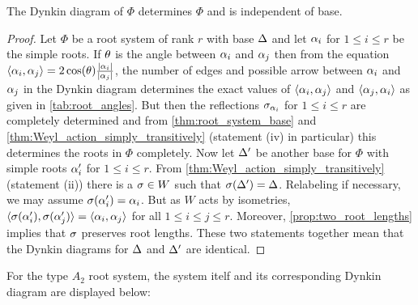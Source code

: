 \documentclass[12pt,reqno,oneside]{amsart}
\begin{document}
    \begin{proposition}\label{prop:Dynkin_diagram_unique}
        The Dynkin diagram of $\Phi$ determines $\Phi$ and is independent of base. 
    \end{proposition}
    \begin{proof}
        Let $\Phi$ be a root system of rank $r$ with base $\Delta$ and let $\alpha_{i}$ for $1 \le i \le r$ be the simple roots. If $\theta$ is the angle between $\alpha_{i}$ and $\alpha_{j}$ then from the equation $\langle\alpha_{i},\alpha_{j}\rangle = 2\cos(\theta)\frac{|\alpha_{i}|}{|\alpha_{j}|}$, the number of edges and possible arrow between $\alpha_{i}$ and $\alpha_{j}$ in the Dynkin diagram determines the exact values of $\langle\alpha_{i},\alpha_{j}\rangle$ and $\langle\alpha_{j},\alpha_{i}\rangle$ as given in \cref{tab:root_angles}. But then the reflections $\sigma_{\alpha_{i}}$ for $1 \le i \le r$ are completely determined and from \cref{thm:root_system_base} and \cref{thm:Weyl_action_simply_transitively} (statement (iv) in particular) this determines the roots in $\Phi$ completely. Now let $\Delta'$ be another base for $\Phi$ with simple roots $\alpha_{i}'$ for $1 \le i \le r$. From \cref{thm:Weyl_action_simply_transitively} (statement (ii)) there is a $\sigma \in W$ such that $\sigma(\Delta') = \Delta$. Relabeling if necessary, we may assume $\sigma(\alpha_{i}') = \alpha_{i}$. But as $W$ acts by isometries, $\langle\sigma(\alpha_{i}'),\sigma(\alpha_{j}')\rangle = \langle\alpha_{i},\alpha_{j}\rangle$ for all $1 \le i \le j \le r$. Moreover, \cref{prop:two_root_lengths} implies that $\sigma$ preserves root lengths. These two statements together mean that the Dynkin diagrams for $\Delta$ and $\Delta'$ are identical.
    \end{proof}

    For the type $A_{2}$ root system, the system itelf and its corresponding Dynkin diagram are displayed below:
    
    \begin{center}
    \end{center}
\end{document}
